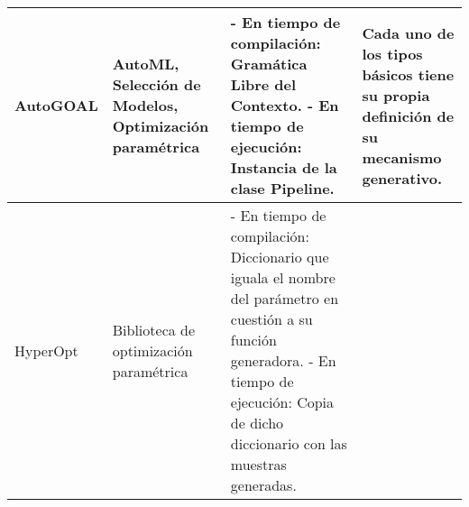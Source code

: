 \begin{longtable}{  p{2.5cm}  p{4cm}  p{6.8cm}  p{6.5cm} }
    AutoGOAL                                                                                                                                                                                                                                                                                                                                                      &
    AutoML, Selección de Modelos, Optimización paramétrica                                                                                                                                                                                                                                                                                                        &
    - En tiempo de compilación: Gramática Libre del Contexto. \newline- En tiempo de ejecución: Instancia de la clase Pipeline.                                                                                                                                                                                                                                    &
    Cada uno de los tipos básicos tiene su propia definición de su mecanismo generativo.                                                                                                                                                                                                                                                                             \\
    \hline
    HyperOpt                                                                                                                                                                                                                                                                                                                                                      &
    Biblioteca de optimización paramétrica                                                                                                                                                                                                                                                                                                                        &
    - En tiempo de compilación: Diccionario que iguala el nombre del parámetro en cuestión a su función generadora. \newline- En tiempo de ejecución: Copia de dicho diccionario con las muestras generadas.                                                                                                                                                        &

\end{longtable}
